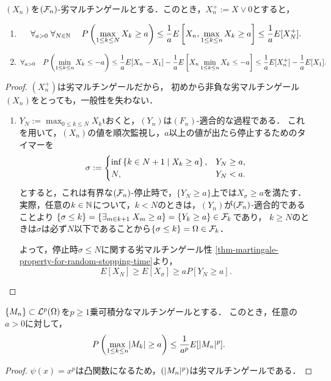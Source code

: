 \documentclass[uplatex,dvipdfmx]{jsreport}
\begin{document}
\begin{theorem}\label{thm-Doob-inequality}
    $(X_n)$を$(\mathcal{F}_n)$-劣マルチンゲールとする．このとき，$X_n^+:=X\lor0$とすると，
    \begin{enumerate}
        \item \[\forall_{a>0}\;\forall_{N\in\mathbb{N}}\;\quad P\left(\max_{1\le k\le N}X_k\ge a\right)\le\frac{1}{a}E\left[X_n,\max_{1\le k\le n}X_k\ge a\right]\le\frac{1}{a}E[X_N^+].\]
        \item \[\forall_{a>0}\quad P\left(\min_{1\le k\le n}X_k\le -a\right)\le\frac{1}{a}E[X_n-X_1]-\frac{1}{a}E\left[X_n\min_{1\le k\le n}X_k\le -a\right]\le\frac{1}{a}E[X_n^+]-\frac{1}{a}E[X_1].\]
    \end{enumerate}
\end{theorem}
\begin{proof}
    $(X^+_n)$は劣マルチンゲールだから，
    初めから非負な劣マルチンゲール$(X_n)$をとっても，一般性を失わない．
    \begin{enumerate}
        \item $Y_N:=\max_{0\le k\le N}X_k$tおくと，$(Y_n)$は$(F_n)$-適合的な過程である．
        これを用いて，$(X_n)$の値を順次監視し，$a$以上の値が出たら停止するためのタイマーを
        \[\sigma:=\begin{cases}
            \inf\left\{k\in N+1\mid X_k\ge a\right\},&Y_N\ge a,\\
            N,&Y_N<a.
        \end{cases}\]
        とすると，これは有界な$(\mathcal{F}_n)$-停止時で，$\{Y_N\ge a\}$上では$X_\sigma\ge a$を満たす．
        実際，任意の$k\in\mathbb{N}$について，$k<N$のときは，$(Y_n)$が$(\mathcal{F}_n)$-適合的であることより
        $\{\sigma\le k\}=\{\exists_{m\in k+1}\;X_m\ge a\}=\{Y_k\ge a\}\in\mathcal{F}_k$であり，
        $k\ge N$のときは$\sigma$は必ず$N$以下であることから$\{\sigma\le k\}=\Omega\in\mathcal{F}_k$．

        よって，停止時$\sigma\le N$に関する劣マルチンゲール性
        \ref{thm-martingale-property-for-random-stopping-time}より，
        \[E[X_N]\ge E[X_\sigma]\ge aP[Y_N\ge a].\]
    \end{enumerate}
\end{proof}

\begin{corollary}
    $\{M_n\}\subset\mathcal{L}^p(\Omega)$を$p\ge1$乗可積分なマルチンゲールとする．
    このとき，任意の$a>0$に対して，
    \[P\left(\max_{1\le k\le n}\lvert M_k\rvert\ge a\right)\le\frac{1}{a^p}E[\lvert M_n\rvert^p].\]
\end{corollary}
\begin{proof}
    $\psi(x)=x^p$は凸関数になるため，$(\lvert M_n\rvert^p)$は劣マルチンゲールである．
\end{proof}
\end{document}
